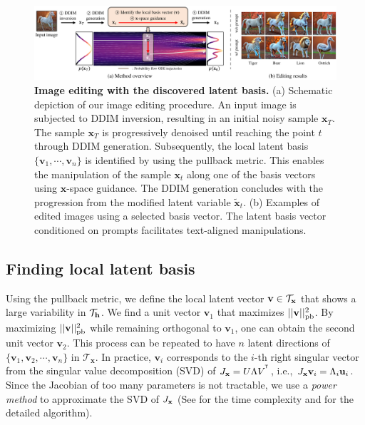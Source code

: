 \begin{figure}[!t]
    \centering
    \includegraphics[width=1\linewidth]{figure/method_rebuttal_circle.pdf}
    \vspace{-1em}
    \caption{\textbf{Image editing with the discovered latent basis.} 
    (a) Schematic depiction of our image editing procedure. 
     An input image is subjected to DDIM inversion, resulting in an initial noisy sample $\mathbf{x}_T$. 
     The sample $\mathbf{x}_T$ is progressively denoised until reaching the point $t$ through DDIM generation. 
     Subsequently, the local latent basis $\{\mathbf{v}_1, \cdots, \mathbf{v}_n\}$ is identified by using the pullback metric. 
     This enables the manipulation of the sample $\mathbf{x}_t$ along one of the basis vectors using $\mathbf{x}$-space guidance. 
     The DDIM generation concludes with the progression from the modified latent variable $\tilde{\mathbf{x}}_t$.
    (b) Examples of edited images using a selected basis vector. The latent basis vector  conditioned on prompts  facilitates text-aligned manipulations.
    }
    \vspace{-1em}
    \label{fig:method}
\end{figure}


\subsection{Finding local latent basis}
Using the pullback metric, 
{
we define the local latent vector $\mathbf{v} \in \mathcal{T}_\mathbf{x}{}$ {that shows a large variability in $\mathcal{T}_\mathbf{h}{}$}.
We find a unit vector $\mathbf{v}_1$ that maximizes $||\mathbf{v}{}||^2_\text{pb}$.
}
By maximizing $||\mathbf{v}{}||^2_\text{pb}$ while remaining orthogonal to $\mathbf{v}_1$, one can obtain the second unit vector $\mathbf{v}_2$. This process can be repeated to have $n$ latent directions of $\{\mathbf{v}_1, \mathbf{v}_2, \cdots, \mathbf{v}_n \}$ in $\mathcal{T}_{\mathbf{x}}$. 
In practice, $\mathbf{v}_i$ corresponds to the $i$-th right singular vector from the singular value decomposition {(SVD)} of ${J}_{\mathbf{x}}{} = U \Lambda V^{^{\mkern-1.5mu\mathsf{T}}}$, i.e., $J_{\mathbf{x}} \mathbf{v}_{i} = \Lambda_{i} \mathbf{u}_{i}$. 
Since the Jacobian of too many parameters is not tractable, we use a \textit{power method} \cite{golub2013matrix,miyato2018spectral,haas2023discovering} to approximate the SVD of ${J}_{\mathbf{x}}{}$
{(See  for the time complexity and  for the detailed algorithm).} 

